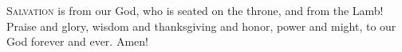 
\lettrine{S}{alvation} is from our God, who is seated on the throne,
and from the Lamb! Praise and glory, wisdom and thanksgiving
and honor, power and might, to our God forever and ever. Amen!
